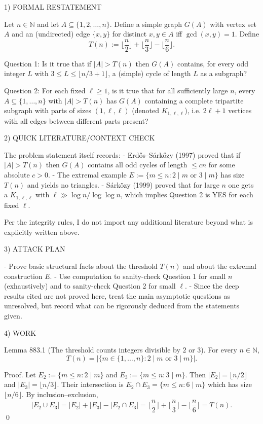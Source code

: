 1) FORMAL RESTATEMENT

Let $n\in\mathbb N$ and let $A\subseteq\{1,2,\dots,n\}$. Define a simple graph $G(A)$ with vertex set $A$ and an (undirected) edge $\{x,y\}$ for distinct $x,y\in A$ iff $\gcd(x,y)=1$.
Define
\[T(n):=\Big\lfloor\frac n2\Big\rfloor+\Big\lfloor\frac n3\Big\rfloor-\Big\lfloor\frac n6\Big\rfloor.
\]

Question 1: Is it true that if $|A|>T(n)$ then $G(A)$ contains, for every odd integer $L$ with $3\le L\le \lfloor n/3+1\rfloor$, a (simple) cycle of length $L$ as a subgraph?

Question 2: For each fixed $\ell\ge 1$, is it true that for all sufficiently large $n$, every $A\subseteq\{1,\dots,n\}$ with $|A|>T(n)$ has $G(A)$ containing a complete tripartite subgraph with parts of sizes $(1,\ell,\ell)$ (denoted $K_{1,\ell,\ell}$), i.e. $2\ell+1$ vertices with all edges between different parts present?

2) QUICK LITERATURE/CONTEXT CHECK

The problem statement itself records:
- Erd\H{o}s--S\'{a}rk\H{o}zy (1997) proved that if $|A|>T(n)$ then $G(A)$ contains all odd cycles of length $\le c n$ for some absolute $c>0$.
- The extremal example $E:=\{m\le n: 2\mid m\text{ or }3\mid m\}$ has size $T(n)$ and yields no triangles.
- S\'{a}rk\"{o}zy (1999) proved that for large $n$ one gets a $K_{1,\ell,\ell}$ with $\ell\gg \log n/\log\log n$, which implies Question 2 is YES for each fixed $\ell$.

Per the integrity rules, I do not import any additional literature beyond what is explicitly written above.

3) ATTACK PLAN

- Prove basic structural facts about the threshold $T(n)$ and about the extremal construction $E$.
- Use computation to sanity-check Question 1 for small $n$ (exhaustively) and to sanity-check Question 2 for small $\ell$.
- Since the deep results cited are not proved here, treat the main asymptotic questions as unresolved, but record what can be rigorously deduced from the statements given.

4) WORK

Lemma 883.1 (The threshold counts integers divisible by $2$ or $3$).
For every $n\in\mathbb N$,
\[T(n)=\big|\{m\in\{1,\dots,n\}: 2\mid m\text{ or }3\mid m\}\big|.
\]

Proof.
Let $E_2:=\{m\le n: 2\mid m\}$ and $E_3:=\{m\le n: 3\mid m\}$. Then $|E_2|=\lfloor n/2\rfloor$ and $|E_3|=\lfloor n/3\rfloor$.
Their intersection is $E_2\cap E_3=\{m\le n: 6\mid m\}$ which has size $\lfloor n/6\rfloor$.
By inclusion--exclusion,
\[|E_2\cup E_3|=|E_2|+|E_3|-|E_2\cap E_3|=\Big\lfloor\frac n2\Big\rfloor+\Big\lfloor\frac n3\Big\rfloor-\Big\lfloor\frac n6\Big\rfloor=T(n).\]
\qed

